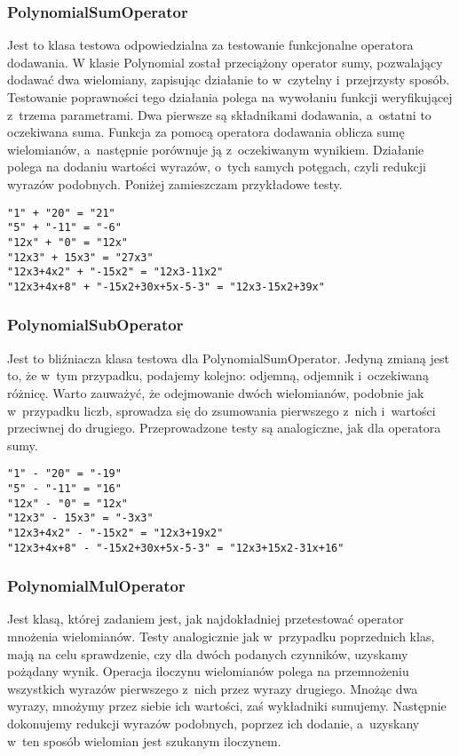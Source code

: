 \subsubsection{PolynomialSumOperator}

Jest to klasa testowa odpowiedzialna za testowanie funkcjonalne operatora dodawania. W klasie Polynomial został przeciążony operator sumy, pozwalający dodawać dwa wielomiany, zapisując działanie to w~czytelny i~przejrzysty sposób. Testowanie poprawności tego działania polega na wywołaniu funkcji weryfikującej z~trzema parametrami. Dwa pierwsze są składnikami dodawania, a~ostatni to oczekiwana suma. Funkcja za pomocą operatora dodawania oblicza sumę wielomianów, a~następnie porównuje ją z~oczekiwanym wynikiem. Działanie polega na dodaniu wartości wyrazów, o~tych samych potęgach, czyli redukcji wyrazów podobnych. Poniżej zamieszczam przykładowe testy.

\begin{lstlisting}
"1" + "20" = "21"
"5" + "-11" = "-6"
"12x" + "0" = "12x"
"12x3" + 15x3" = "27x3"
"12x3+4x2" + "-15x2" = "12x3-11x2"
"12x3+4x+8" + "-15x2+30x+5x-5-3" = "12x3-15x2+39x"
\end{lstlisting}

\subsubsection{PolynomialSubOperator}

Jest to bliźniacza klasa testowa dla PolynomialSumOperator. Jedyną zmianą jest to, że w~tym przypadku, podajemy kolejno: odjemną, odjemnik i~oczekiwaną różnicę. Warto zauważyć, że odejmowanie dwóch wielomianów, podobnie jak w~przypadku liczb, sprowadza się do zsumowania pierwszego z~nich i~wartości przeciwnej do drugiego. Przeprowadzone testy są analogiczne, jak dla operatora sumy.

\begin{lstlisting}
"1" - "20" = "-19"
"5" - "-11" = "16"
"12x" - "0" = "12x"
"12x3" - 15x3" = "-3x3"
"12x3+4x2" - "-15x2" = "12x3+19x2"
"12x3+4x+8" - "-15x2+30x+5x-5-3" = "12x3+15x2-31x+16"
\end{lstlisting}

\subsubsection{PolynomialMulOperator}

Jest klasą, której zadaniem jest, jak najdokładniej przetestować operator mnożenia wielomianów. Testy analogicznie jak w~przypadku poprzednich klas, mają na celu sprawdzenie, czy dla dwóch podanych czynników, uzyskamy pożądany wynik. Operacja iloczynu wielomianów polega na przemnożeniu wszystkich wyrazów pierwszego z~nich przez wyrazy drugiego. Mnożąc dwa wyrazy, mnożymy przez siebie ich wartości, zaś wykładniki sumujemy. Następnie dokonujemy redukcji wyrazów podobnych, poprzez ich dodanie, a~uzyskany w~ten sposób wielomian jest szukanym iloczynem.


